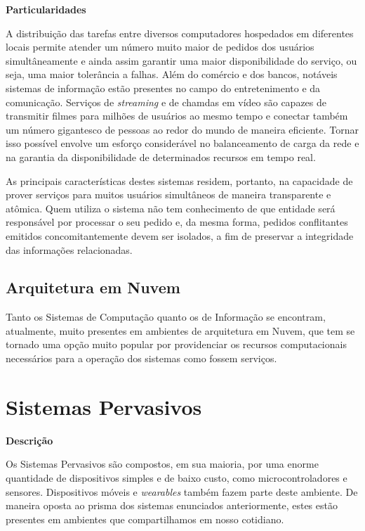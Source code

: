 \documentclass[brazil]{homework}
\begin{document}
\textbf{Particularidades}

A distribuição das tarefas entre diversos computadores hospedados em diferentes locais permite atender um número muito maior de pedidos dos usuários simultâneamente e ainda assim garantir uma maior disponibilidade do serviço, ou seja, uma maior tolerância a falhas. Além do comércio e dos bancos, notáveis sistemas de informação estão presentes no campo do entretenimento e da comunicação. Serviços de \textit{streaming} e de chamdas em vídeo são capazes de transmitir filmes para milhões de usuários ao mesmo tempo e conectar também um número gigantesco de pessoas ao redor do mundo de maneira eficiente. Tornar isso possível envolve um esforço considerável no balanceamento de carga da rede e na garantia da disponibilidade de determinados recursos em tempo real.

As principais características destes sistemas residem, portanto, na capacidade de prover serviços para muitos usuários simultâneos de maneira transparente e atômica. Quem utiliza o sistema não tem conhecimento de que entidade será responsável por processar o seu pedido e, da mesma forma, pedidos conflitantes emitidos concomitantemente devem ser isolados, a fim de preservar a integridade das informações relacionadas.

\subsection*{Arquitetura em Nuvem}

Tanto os Sistemas de Computação quanto os de Informação se encontram, atualmente, muito presentes em ambientes de arquitetura em Nuvem, que tem se tornado uma opção muito popular por providenciar os recursos computacionais necessários para a operação dos sistemas como fossem serviços. 

\section*{Sistemas Pervasivos}

\textbf{Descrição}

Os Sistemas Pervasivos são compostos, em sua maioria, por uma enorme quantidade de dispositivos simples e de baixo custo, como microcontroladores e sensores. Dispositivos móveis e \textit{wearables} também fazem parte deste ambiente. De maneira oposta ao prisma dos sistemas enunciados anteriormente, estes estão presentes em ambientes que compartilhamos em nosso cotidiano.
\end{document}
